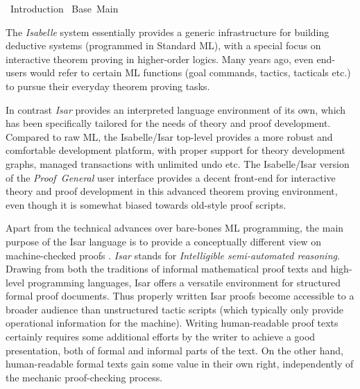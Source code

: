 %
\begin{isabellebody}%
\def\isabellecontext{Introduction}%
%
\isadelimtheory
%
\endisadelimtheory
%
\isatagtheory
{}\isamarkupfalse%
\ Introduction\isanewline
{}\ Base\ Main\isanewline
{}%
\endisatagtheory
{\isafoldtheory}%
%
\isadelimtheory
%
\endisadelimtheory
%
\isamarkuptrue%
%
\isamarkuptrue%
%
\begin{isamarkuptext}%
The \emph{Isabelle} system essentially provides a generic
  infrastructure for building deductive systems (programmed in
  Standard ML), with a special focus on interactive theorem proving in
  higher-order logics.  Many years ago, even end-users would refer to
  certain ML functions (goal commands, tactics, tacticals etc.) to
  pursue their everyday theorem proving tasks.
  
  In contrast \emph{Isar} provides an interpreted language environment
  of its own, which has been specifically tailored for the needs of
  theory and proof development.  Compared to raw ML, the Isabelle/Isar
  top-level provides a more robust and comfortable development
  platform, with proper support for theory development graphs, managed
  transactions with unlimited undo etc.  The Isabelle/Isar version of
  the \emph{Proof~General} user interface
  \cite{proofgeneral,Aspinall:TACAS:2000} provides a decent front-end
  for interactive theory and proof development in this advanced
  theorem proving environment, even though it is somewhat biased
  towards old-style proof scripts.

  \medskip Apart from the technical advances over bare-bones ML
  programming, the main purpose of the Isar language is to provide a
  conceptually different view on machine-checked proofs
  \cite{Wenzel:1999:TPHOL,Wenzel-PhD}.  \emph{Isar} stands for
  \emph{Intelligible semi-automated reasoning}.  Drawing from both the
  traditions of informal mathematical proof texts and high-level
  programming languages, Isar offers a versatile environment for
  structured formal proof documents.  Thus properly written Isar
  proofs become accessible to a broader audience than unstructured
  tactic scripts (which typically only provide operational information
  for the machine).  Writing human-readable proof texts certainly
  requires some additional efforts by the writer to achieve a good
  presentation, both of formal and informal parts of the text.  On the
  other hand, human-readable formal texts gain some value in their own
  right, independently of the mechanic proof-checking process.


\end{isamarkuptext}
\end{isabellebody}
